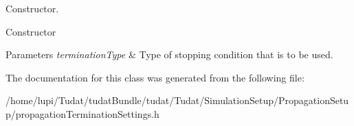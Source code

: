 Constructor. 

Constructor 
\begin{DoxyParams}{Parameters}
{\em termination\+Type} & Type of stopping condition that is to be used. \\
\hline
\end{DoxyParams}


The documentation for this class was generated from the following file\+:\begin{DoxyCompactItemize}
\item 
/home/lupi/\+Tudat/tudat\+Bundle/tudat/\+Tudat/\+Simulation\+Setup/\+Propagation\+Setup/propagation\+Termination\+Settings.\+h\end{DoxyCompactItemize}
